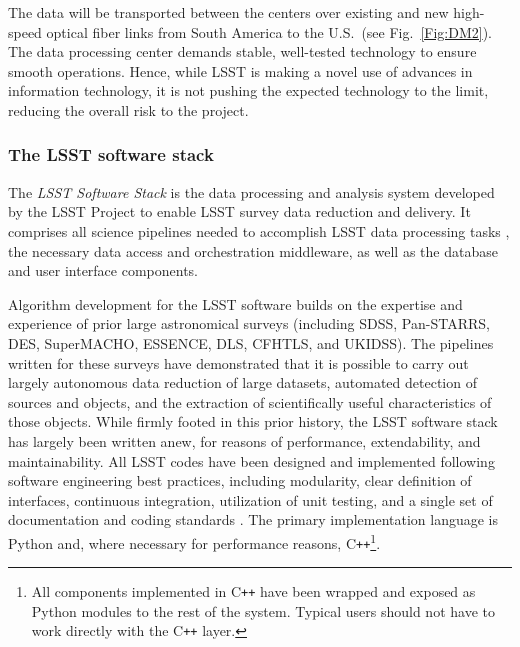 The data will be transported between the centers over existing and new high-speed optical fiber
links from South America to the U.S.\ (see Fig.~\ref{Fig:DM2}). The data processing center demands
stable, well-tested technology to ensure smooth operations. Hence, while LSST is making a novel
use of advances in information technology, it is not pushing the expected technology to the limit,
reducing the overall risk to the project.

\subsubsection{The LSST software stack}
\label{sec:dmstack}

The \emph{LSST Software Stack} is the data processing and analysis
system developed by the LSST Project to enable LSST survey data
reduction and delivery. It comprises
all science pipelines needed to accomplish LSST data processing tasks
\citep[e.g., calibration, single frame processing, coaddition, image
differencing, multi-epoch measurement, and asteroid orbit determination; see ][for an overview]{2018arXiv181203248B},
the necessary data access \citep[e.g.,][]{adassxxviii_P7-14} and orchestration middleware, as well as the database and user
interface components.


Algorithm development for the LSST software builds on the expertise
and experience of prior large astronomical surveys (including SDSS,
Pan-STARRS, DES,
SuperMACHO, ESSENCE,  DLS, CFHTLS, and UKIDSS). The pipelines written
for these surveys have demonstrated that it is possible to carry out
largely autonomous data
reduction of large datasets, automated detection of sources and
objects, and the
extraction of scientifically useful characteristics of those objects.
While firmly footed in this prior history, the LSST software stack has
largely been written anew, for reasons of performance, extendability, and
maintainability. All LSST codes have been designed and implemented
following software engineering best practices, including modularity, clear definition
of interfaces, continuous integration,
utilization of unit testing, and a single set of documentation and coding
standards \citep{2018SPIE10707E..09J}. The primary implementation language is Python and, where
necessary for performance reasons, C\texttt{++}\footnote{All components implemented
in C\texttt{++} have been wrapped and exposed as Python modules to the rest of the system.
Typical users should not have to work directly with the C\texttt{++} layer.}.

